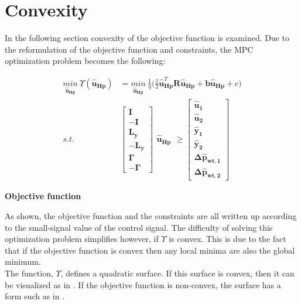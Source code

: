 \section{Convexity}
\label{convexity}
In the following section convexity of the objective function is examined. 
Due to the reformulation of the objective function and constraints, the MPC optimization problem becomes the following: 

\begin{align}
\underset{\bm{\hat{u}_{Hp}}}{min} \:  \Upsilon(\bm{\hat{u}}_{\bm{Hp}}) &= \underset{\bm{\hat{u}_{Hp}}}{min} \:  \frac{1}{\eta}\bigg( \frac{1}{2} \bm{\hat{u}}_{\bm{Hp}}^{T} \bm{R} \bm{\hat{u}}_{\bm{Hp}} + \bm{b} \bm{\hat{u}}_{\bm{Hp}} + c \bigg)\\
\label{eq:obj_final1}
%
s.t. \:\:\:\:\:	&\begin{bmatrix}
		\bm{I} 	\\
		-\bm{I} 	\\
		\bm{L_{y}}	\\
		-\bm{L_{y}}	\\
		\bm{\Gamma}	\\
		-\bm{\Gamma}
	\end{bmatrix}
	\begin{matrix}
			\bm{\hat{u}_{Hp}}
	\end{matrix}
	\geq 
	\begin{bmatrix}
			\bm{\hat{u}_{1}}	\\
			\bm{\hat{u}_{2}}	\\
			\bm{\hat{y}_{1}}	\\
			\bm{\hat{y}_{2}}	\\
			\bm{\Delta \hat{p}_{wt,1}}	\\
			\bm{\Delta \hat{p}_{wt,2}}	
	\end{bmatrix}
\end{align}

\textbf{Objective function}

As shown, the objective function and the constraints are all written up according to the small-signal value of the control signal. The difficulty of solving this optimization problem simplifies however, if $\Upsilon$ is convex. This is due to the fact that if the objective function is convex then any local minima are also the global minimum. 
\\
The function, $\Upsilon$, defines a quadratic surface. If this surface is convex, then it can be visualized as in . If the objective function is non-convex, the surface has a form such as in . 

